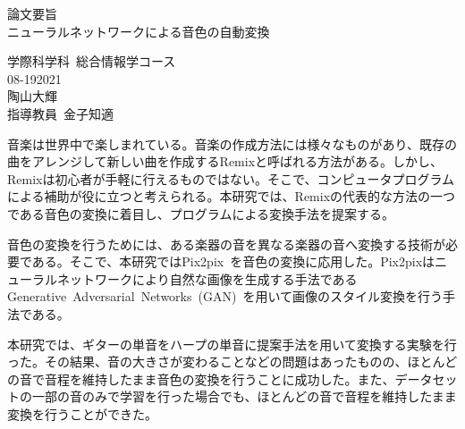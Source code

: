 \documentclass[10pt,a4paper,dvipdfmx]{jsreport}
\begin{document}
\begin{center}
{\huge 論文要旨}\\
\vspace{40truept}
{\huge ニューラルネットワークによる音色の自動変換}
\end{center}

\vspace{30truept}

\begin{flushright}
{\Large 学際科学科~総合情報学コース}\\ 
\vspace{5truept}
{\Large 08-192021}\\ 
\vspace{5truept}
{\Large 陶山大輝}\\
\vspace{5truept} 
{\Large 指導教員~金子知適}\\
\end{flushright}

\vspace{30truept}

{\large

音楽は世界中で楽しまれている。音楽の作成方法には様々なものがあり、既存の曲をアレンジして新しい曲を作成するRemixと呼ばれる方法がある。しかし、Remixは初心者が手軽に行えるものではない。そこで、コンピュータプログラムによる補助が役に立つと考えられる。本研究では、Remixの代表的な方法の一つである音色の変換に着目し、プログラムによる変換手法を提案する。

音色の変換を行うためには、ある楽器の音を異なる楽器の音へ変換する技術が必要である。そこで、本研究ではPix2pix~\cite{pix2pix}を音色の変換に応用した。Pix2pixはニューラルネットワークにより自然な画像を生成する手法であるGenerative~Adversarial~Networks~(GAN)~\cite{GAN}を用いて画像のスタイル変換を行う手法である。

本研究では、ギターの単音をハープの単音に提案手法を用いて変換する実験を行った。その結果、音の大きさが変わることなどの問題はあったものの、ほとんどの音で音程を維持したまま音色の変換を行うことに成功した。また、データセットの一部の音のみで学習を行った場合でも、ほとんどの音で音程を維持したまま変換を行うことができた。

}

\renewcommand{\clearpage}{}

\end{document}
